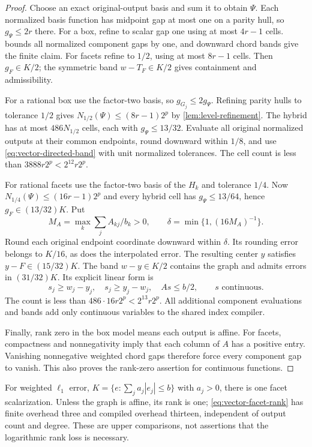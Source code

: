 \begin{proof}
Choose an exact original-output basis and sum it to obtain $\Psi$.
Each normalized basis function has midpoint gap at most one on a
parity hull, so $g_\Psi\le2r$ there. For a box, refine to scalar gap
one using at most $4r-1$ cells.  bounds
all normalized component gaps by one, and downward chord bands give
the finite claim. For facets refine to $1/2$, using at most $8r-1$
cells. Then $g_F\in K/2$; the symmetric band $w-T_F\in K/2$ gives
containment and admissibility.

For a rational box use the factor-two basis, so
$g_{G_j}\le2g_\Psi$. Refining parity hulls to tolerance $1/2$ gives
$N_{1/2}(\Psi)\le(8r-1)2^p$ by \cref{lem:level-refinement}.
The hybrid has at most $486N_{1/2}$ cells, each with
$g_\Psi\le13/32$. Evaluate all original normalized outputs at their
common endpoints, round downward within $1/8$, and use
\eqref{eq:vector-directed-band} with unit normalized tolerances.
The cell count is less than $3888r2^p<2^{12}r2^p$.

For rational facets use the factor-two basis of the $H_k$ and tolerance
$1/4$. Now $N_{1/4}(\Psi)\le(16r-1)2^p$ and every hybrid cell has
$g_\Psi\le13/64$, hence $g_F\in(13/32)K$. Put
\[
 M_A=\max_k\sum_j A_{kj}/b_k>0,
 \qquad \delta=\min\{1,(16M_A)^{-1}\}.
\]
Round each original endpoint coordinate downward within $\delta$.
Its rounding error belongs to $K/16$, as does the interpolated error.
The resulting center $y$ satisfies $y-F\in(15/32)K$.
The band $w-y\in K/2$ contains the graph and admits errors in
$(31/32)K$. Its explicit linear form is
\begin{equation}\label{eq:facet-linear-band}
 s_j\ge w_j-y_j,\quad s_j\ge y_j-w_j,\quad As\le b/2,
 \qquad s\text{ continuous}.
\end{equation}
The count is less than $486\cdot16r2^p<2^{13}r2^p$.
All additional component evaluations and bands add only continuous
variables to the shared index compiler.

Finally, rank zero in the box model means each output is affine.
For facets, compactness and nonnegativity imply that each column of
$A$ has a positive entry. Vanishing nonnegative weighted chord gaps
therefore force every component gap to vanish. This also proves the
rank-zero assertion for continuous functions.
\end{proof}

For weighted $\ell_1$ error, $K=\{e:\sum_j a_j|e_j|\le b\}$ with
$a_j>0$, there is one facet scalarization. Unless the graph is affine,
its rank is one; \eqref{eq:vector-facet-rank} has finite overhead three
and compiled overhead thirteen, independent of output count and degree.
These are upper comparisons, not assertions that the logarithmic rank
loss is necessary.

